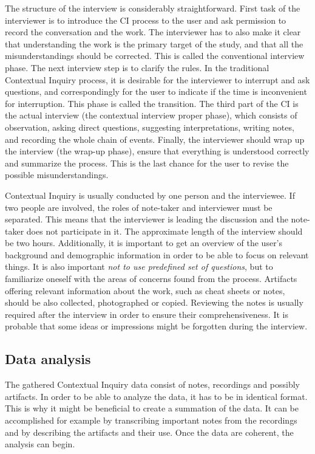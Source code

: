 \documentclass[12pt,a4paper,oneside,pdftex]{report}
\begin{document}
The structure of the interview is considerably straightforward. First task of the interviewer is to introduce the CI process to the user and ask permission to record the conversation and the work. The interviewer has to also make it clear that understanding the work is the primary target of the study, and that all the misunderstandings should be corrected. This is called the conventional interview phase. The next interview step is to clarify the rules. In the traditional Contextual Inquiry process, it is desirable for the interviewer to interrupt and ask questions, and correspondingly for the user to indicate if the time is inconvenient for interruption. This phase is called the transition. The third part of the CI is the actual interview (the contextual interview proper phase), which consists of observation, asking direct questions, suggesting interpretations, writing notes, and recording the whole chain of events. Finally, the interviewer should wrap up the interview (the wrap-up phase), ensure that everything is understood correctly and summarize the process. This is the last chance for the user to revise the possible misunderstandings. \citep{RefWorks:21}

Contextual Inquiry is usually conducted by one person and the interviewee. If two people are involved, the roles of note-taker and interviewer must be separated. This means that the interviewer is leading the discussion and the note-taker does not participate in it. The approximate length of the interview should be two hours. Additionally, it is important to get an overview of the user's background and demographic information in order to be able to focus on relevant things. It is also important \emph{not to use predefined set of questions}, but to familiarize oneself with the areas of concerns found from the process. Artifacts offering relevant information about the work, such as cheat sheets or notes, should be also collected, photographed or copied. \citep{RefWorks:27} Reviewing the notes is usually required after the interview in order to ensure their comprehensiveness. It is probable that some ideas or impressions might be forgotten during the interview. \citep{RefWorks:28}


\subsection{Data analysis}

The gathered Contextual Inquiry data consist of notes, recordings and possibly artifacts. In order to be able to analyze the data, it has to be in identical format. This is why it might be beneficial to create a summation of the data. It can be accomplished for example by transcribing important notes from the recordings and by describing the artifacts and their use. Once the data are coherent, the analysis can begin. 
\end{document}
